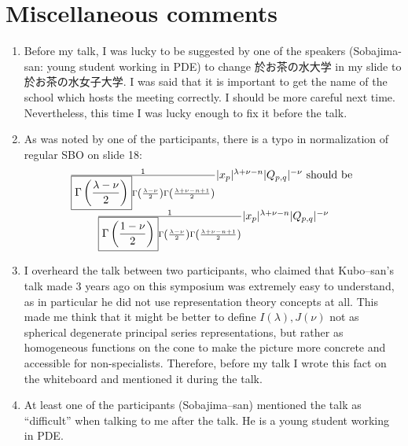 \documentclass[12pt]{article} %
\theoremstyle{theorem}
\theoremstyle{definition}
\theoremstyle{remark}
\begin{document}
\section{Miscellaneous comments}
\begin{enumerate}
    \item Before my talk, I was lucky to be suggested by one of the speakers (Sobajima-san: young student 
        working in PDE) to change 
於お茶の水大学 in my slide to 
於お茶の水女子大学. I was said that it is important to get the name of the school which hosts the meeting correctly.
I should be more careful next time. Nevertheless, this time I was lucky enough to fix it before the talk.
\item As was noted by one of the participants, there is a typo in normalization of regular SBO on slide 18:\begin{equation*}
        \begin{array}[]{c}
				\frac{1}{
                    \boxed{\Gamma
                        \left( \frac{\lambda - \nu}{2} \right)} \Gamma \left( \frac{\lambda - \nu}{2}
				\right) \Gamma \left( \frac{\lambda + \nu - n + 1}{2} \right)} | x_p
                |^{\lambda + \nu - n} | Q_{p, q} |^{- \nu}\mbox{ should be }\\
				\frac{1}{\boxed{\Gamma
                    \left( \frac{1 - \nu}{2} \right)} \Gamma \left( \frac{\lambda - \nu}{2}
				\right) \Gamma \left( \frac{\lambda + \nu - n + 1}{2} \right)} | x_p
                |^{\lambda + \nu - n} | Q_{p, q} |^{- \nu}
        \end{array}
    \end{equation*}
\item I overheard the talk between two participants, who claimed that Kubo--san's talk made 3 years ago on this symposium
    was extremely easy to understand, as in particular he did not use representation theory concepts at all.
    This made me think that it might be better to define $I(\lambda),J(\nu)$ not as spherical degenerate principal
    series representations, but rather as homogeneous functions on the cone to make the picture more concrete and accessible
    for non-specialists. Therefore, before my talk I wrote this fact on the whiteboard and mentioned it during the talk.
\item At least one of the participants (Sobajima--san)
    mentioned the talk as ``difficult'' when talking to me after the talk. He is a young
    student working in PDE.
\end{enumerate}
\end{document}
